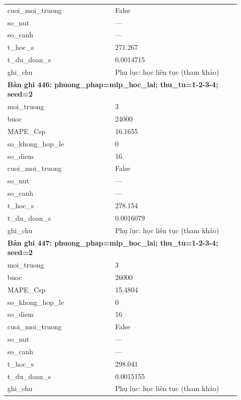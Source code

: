 \begin{longtable}{p{0.43\linewidth}p{0.50\linewidth}}
cuoi\_\allowbreak moi\_\allowbreak truong & False \\
so\_\allowbreak nut & — \\
so\_\allowbreak canh & — \\
t\_\allowbreak hoc\_\allowbreak s & 271.267 \\
t\_\allowbreak du\_\allowbreak doan\_\allowbreak s & 0.0014715 \\
ghi\_\allowbreak chu & Phụ lục: học liên tục (tham khảo) \\
\midrule
\multicolumn{2}{p{0.95\linewidth}}{\textbf{Bản ghi 446: phuong\_phap=mlp\_hoc\_lai; thu\_tu=1-2-3-4; seed=2}} \\
moi\_\allowbreak truong & 3 \\
buoc & 24000 \\
MAPE\_\allowbreak Csp & 16.1655 \\
so\_\allowbreak khong\_\allowbreak hop\_\allowbreak le & 0 \\
so\_\allowbreak diem & 16 \\
cuoi\_\allowbreak moi\_\allowbreak truong & False \\
so\_\allowbreak nut & — \\
so\_\allowbreak canh & — \\
t\_\allowbreak hoc\_\allowbreak s & 278.154 \\
t\_\allowbreak du\_\allowbreak doan\_\allowbreak s & 0.0016079 \\
ghi\_\allowbreak chu & Phụ lục: học liên tục (tham khảo) \\
\midrule
\multicolumn{2}{p{0.95\linewidth}}{\textbf{Bản ghi 447: phuong\_phap=mlp\_hoc\_lai; thu\_tu=1-2-3-4; seed=2}} \\
moi\_\allowbreak truong & 3 \\
buoc & 26000 \\
MAPE\_\allowbreak Csp & 15.4804 \\
so\_\allowbreak khong\_\allowbreak hop\_\allowbreak le & 0 \\
so\_\allowbreak diem & 16 \\
cuoi\_\allowbreak moi\_\allowbreak truong & False \\
so\_\allowbreak nut & — \\
so\_\allowbreak canh & — \\
t\_\allowbreak hoc\_\allowbreak s & 298.041 \\
t\_\allowbreak du\_\allowbreak doan\_\allowbreak s & 0.0015155 \\
ghi\_\allowbreak chu & Phụ lục: học liên tục (tham khảo) \\

\end{longtable}
